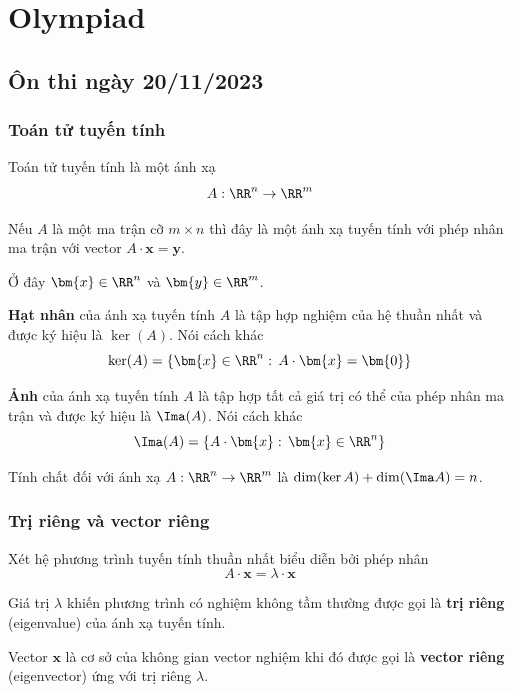 \chapter{Olympiad}

\section{Ôn thi ngày 20/11/2023}

\subsection*{Toán tử tuyến tính}

Toán tử tuyến tính là một ánh xạ \[ A: \RR^n \to \RR^m \]

Nếu $A$ là một ma trận cỡ $m \times n$ thì đây là một ánh xạ tuyến tính với phép nhân ma trận với vector $A \cdot \bm{x} = \bm{y}$.

Ở đây $\bm{x} \in \RR^n$ và $\bm{y} \in \RR^m$.

\begin{definition}
    \textbf{Hạt nhân} của ánh xạ tuyến tính $A$ là tập hợp nghiệm của hệ thuần nhất và được ký hiệu là $\ker(A)$. Nói cách khác
    \begin{equation}
        \ker(A) = \{ \bm{x} \in \RR^n: \, A \cdot \bm{x} = \bm{0} \}
    \end{equation}
\end{definition}

\begin{definition}[Ảnh]
    \textbf{Ảnh} của ánh xạ tuyến tính $A$ là tập hợp tất cả giá trị có thể của phép nhân ma trận và được ký hiệu là $\Ima(A)$. Nói cách khác
    \begin{equation}
        \Ima(A) = \{ A \cdot \bm{x}: \, \bm{x} \in \RR^n \}
    \end{equation}
\end{definition}

Tính chất đối với ánh xạ $A: \RR^n \to \RR^m$ là $\dim(\ker A) + \dim(\Ima A) = n$.

\subsection*{Trị riêng và vector riêng}

\begin{definition}
    Xét hệ phương trình tuyến tính thuần nhất biểu diễn bởi phép nhân \[ A \cdot \bm{x} = \lambda \cdot \bm{x} \]

    Giá trị $\lambda$ khiến phương trình có nghiệm không tầm thường được gọi là \textbf{trị riêng} (eigenvalue) của ánh xạ tuyến tính.

    Vector $\bm{x}$ là cơ sở của không gian vector nghiệm khi đó được gọi là \textbf{vector riêng} (eigenvector) ứng với trị riêng $\lambda$.
\end{definition}

